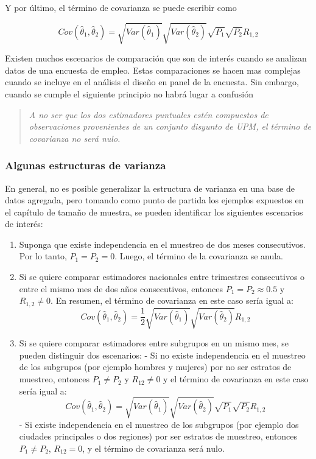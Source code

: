 \documentclass[
  10pt,
  spanish,
]{book}
\providecommand{\tightlist}{%
  \setlength{\itemsep}{0pt}\setlength{\parskip}{0pt}}
\begin{document}
Y por último, el término de covarianza se puede escribir como

\[
Cov(\hat{\theta}_1, \hat{\theta}_2) = \sqrt{Var(\hat{\theta}_1)}\sqrt{Var(\hat{\theta}_2)}\sqrt{P_1}\sqrt{P_2}R_{1,2}
\]

Existen muchos escenarios de comparación que son de interés cuando se
analizan datos de una encuesta de empleo. Estas comparaciones se hacen
mas complejas cuando se incluye en el análisis el diseño en panel de la
encuesta. Sin embargo, cuando se cumple el siguiente principio no habrá
lugar a confusión

\begin{quote}
\emph{A no ser que los dos estimadores puntuales estén compuestos de
observaciones provenientes de un conjunto disyunto de UPM, el término
de covarianza no será nulo.}
\end{quote}

\hypertarget{algunas-estructuras-de-varianza}{%
\subsubsection*{Algunas estructuras de varianza}\label{algunas-estructuras-de-varianza}}

En general, no es posible generalizar la estructura de varianza en una
base de datos agregada, pero tomando como punto de partida los ejemplos
expuestos en el capítulo de tamaño de muestra, se pueden identificar los
siguientes escenarios de interés:

\begin{enumerate}
\def\labelenumi{\arabic{enumi}.}
\tightlist
\item
  Suponga que existe independencia en el muestreo de dos meses
  consecutivos. Por lo tanto, \(P_1 = P_2 = 0\). Luego, el término de la
  covarianza se anula.
\item
  Si se quiere comparar estimadores nacionales entre trimestres
  consecutivos o entre el mismo mes de dos años consecutivos, entonces
  \(P_1 = P_2 \approx 0.5\) y \(R_{1,2} \neq 0\). En resumen, el término
  de covarianza en este caso sería igual a: \[
  Cov(\hat{\theta}_1, \hat{\theta}_2) = \frac{1}{2}\sqrt{Var(\hat{\theta}_1)}\sqrt{Var(\hat{\theta}_2)}R_{1,2}
  \]
\item
  Si se quiere comparar estimadores entre subgrupos en un mismo mes,
  se pueden distinguir dos escenarios: - Si no existe independencia en
  el muestreo de los subgrupos (por ejemplo hombres y mujeres) por no
  ser estratos de muestreo, entonces \(P_1 \neq P_2\) y \(R_{12} \neq 0\)
  y el término de covarianza en este caso sería igual a: \[
  Cov(\hat{\theta}_1, \hat{\theta}_2) = \sqrt{Var(\hat{\theta}_1)}\sqrt{Var(\hat{\theta}_2)}\sqrt{P_1}\sqrt{P_2}R_{1,2}
  \] - Si existe independencia en el muestreo de los subgrupos (por
  ejemplo dos ciudades principales o dos regiones) por ser estratos de
  muestreo, entonces \(P_1 \neq P_2\), \(R_{12} = 0\), y el término de
  covarianza será nulo.
\end{enumerate}
\end{document}
